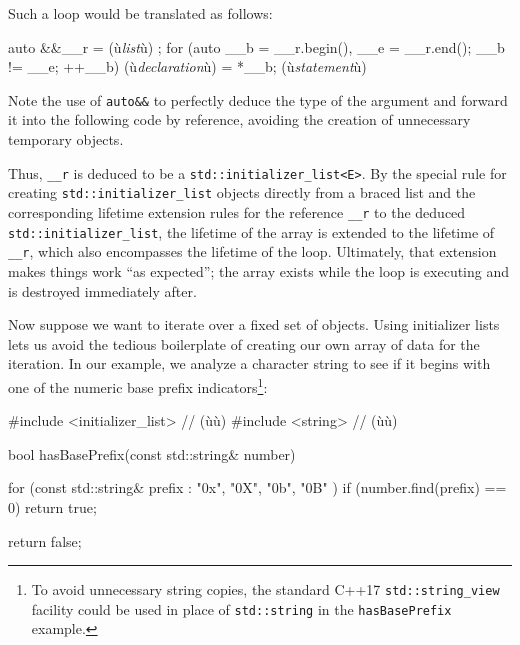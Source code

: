 
\noindent Such a loop would be translated as follows:

\begin{emcppslisting}[emcppsignore={pseudocode}]
{
    auto &&__r = { (ù{\emph{list}}ù) };
    for (auto __b = __r.begin(), __e = __r.end(); __b != __e; ++__b)
    {
        (ù{\emph{declaration}}ù) = *__b;
        (ù{\emph{statement}}ù)
    }
}
\end{emcppslisting}
    

\noindent Note the use of \lstinline!auto&&! to perfectly deduce the type of the
argument and forward it into the following code by reference, avoiding
the creation of unnecessary temporary objects.

Thus, \lstinline!__r! is deduced to be a
\lstinline!std::initializer_list<E>!. By the special rule for creating
\lstinline!std::initializer_list! objects directly from a braced list and
the corresponding lifetime extension rules for the reference
\lstinline!__r! to the deduced \lstinline!std::initializer_list!, the
lifetime of the array is extended to the lifetime of \lstinline!__r!,
which also encompasses the lifetime of the loop. Ultimately, that
extension makes things work ``as expected''; the array exists while the
loop is executing and is destroyed immediately after.

Now suppose we want to iterate over a fixed set of objects. Using
initializer lists lets us avoid the tedious boilerplate of creating our
own array of data for the iteration. In our example, we analyze a
character string to see if it begins with one of the numeric base prefix
indicators{\cprotect\footnote{To avoid unnecessary string copies, the
standard C++17 \lstinline!std::string_view! facility could be used in
  place of \lstinline!std::string! in the \lstinline!hasBasePrefix! example.}}:

\begin{emcppshiddenlisting}[emcppsbatch=e7]
#include <initializer_list>  // (ù{}ù)
#include <string>  // (ù{}ù)
\end{emcppshiddenlisting}
\begin{emcppslisting}[emcppsbatch=e7]
bool hasBasePrefix(const std::string& number)
{
    for (const std::string& prefix : { "0x", "0X", "0b", "0B" })
    {
        if (number.find(prefix) == 0)
        {
            return true;
        }
    }

    return false;
}
\end{emcppslisting}
    

